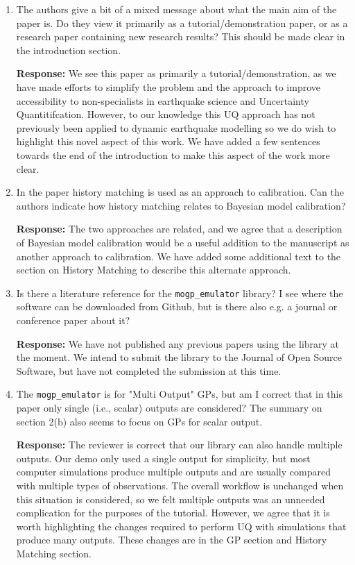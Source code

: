 \documentclass{article}
\begin{document}
\begin{enumerate}

\item The authors give a bit of a mixed message about what the main aim of the paper is. Do they view it primarily as a tutorial/demonstration paper, or as a research paper containing new research results? This should be made clear in the introduction section.


  \textbf{Response:} We see this paper as primarily a tutorial/demonstration,
  as we have made efforts to simplify the problem and the approach to
  improve accessibility to non-specialists in earthquake science and
  Uncertainty Quantitifcation. However, to our knowledge this UQ approach
  has not previously been applied to dynamic earthquake modelling so we
  do wish to highlight this novel aspect of this work. We have added a few
  sentences towards the end of the
  introduction to make this aspect of the work more clear.

\item In the paper history matching is used as an approach to calibration. Can the authors indicate how history matching relates to Bayesian model calibration?

  \textbf{Response:} The two approaches are related, and we agree that a
  description of Bayesian model calibration would be a useful addition to
  the manuscript as another approach to calibration. We have added some
  additional text to the section on History Matching to describe this
  alternate approach.

\item Is there a literature reference for the \texttt{mogp\_emulator} library? I see where the software can be downloaded from Github, but is there also e.g. a journal or conference paper about it?

  \textbf{Response:} We have not published any previous papers using the library
  at the moment. We intend to submit the library to the Journal of Open Source
  Software, but have not completed the submission at this time.

\item The \texttt{mogp\_emulator} is for "Multi Output" GPs, but am I correct that in this paper only single (i.e., scalar) outputs are considered? The summary on section 2(b) also seems to focus on GPs for scalar output.

  \textbf{Response:} The reviewer is correct that our library can also handle
  multiple outputs. Our demo only used a single output for simplicity, but
  most computer simulations produce multiple
  outputs and are usually compared with multiple types of observations.
  The overall workflow is unchanged when this situation is considered,
  so we felt multiple outputs was an
  unneeded complication for the purposes of the tutorial.
  However, we agree that it is worth highlighting the changes required to
  perform UQ with simulations that produce many outputs. These changes are
  in the GP section and History Matching section.


\end{enumerate}
\end{document}
